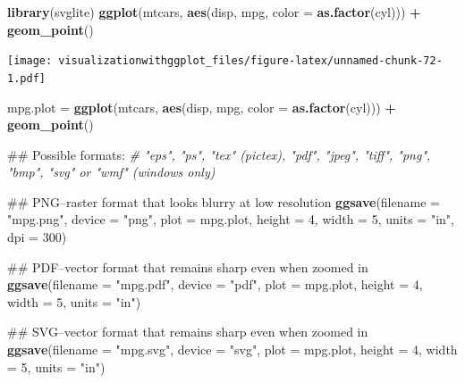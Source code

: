\documentclass[]{krantz}
\makeatletter
\newenvironment{Shaded}{\begin{snugshade}}{\end{snugshade}}
\newcommand{\KeywordTok}[1]{\textcolor[rgb]{0.13,0.29,0.53}{\textbf{#1}}}
\newcommand{\DataTypeTok}[1]{\textcolor[rgb]{0.13,0.29,0.53}{#1}}
\newcommand{\DecValTok}[1]{\textcolor[rgb]{0.00,0.00,0.81}{#1}}
\newcommand{\StringTok}[1]{\textcolor[rgb]{0.31,0.60,0.02}{#1}}
\newcommand{\CommentTok}[1]{\textcolor[rgb]{0.56,0.35,0.01}{\textit{#1}}}
\newcommand{\OperatorTok}[1]{\textcolor[rgb]{0.81,0.36,0.00}{\textbf{#1}}}
\newcommand{\NormalTok}[1]{#1}
\newenvironment{kframe}{%
\medskip{}
\setlength{\fboxsep}{.8em}
 \def\at@end@of@kframe{}%
 \ifinner\ifhmode%
  \def\at@end@of@kframe{\end{minipage}}%
  \begin{minipage}{\columnwidth}%
 \fi\fi%
 \def\FrameCommand##1{\hskip\@totalleftmargin \hskip-\fboxsep
 \colorbox{shadecolor}{##1}\hskip-\fboxsep
     \hskip-\linewidth \hskip-\@totalleftmargin \hskip\columnwidth}%
 \MakeFramed {\advance\hsize-\width
   \@totalleftmargin\z@ \linewidth\hsize
   \@setminipage}}%
 {\par\unskip\endMakeFramed%
 \at@end@of@kframe}
\renewenvironment{Shaded}{\begin{kframe}}{\end{kframe}}
\theoremstyle{definition}
\theoremstyle{definition}
\theoremstyle{definition}
\theoremstyle{remark}
\makeatother
\begin{document}
\begin{Shaded}
\begin{Highlighting}[]
\KeywordTok{library}\NormalTok{(svglite)}
\KeywordTok{ggplot}\NormalTok{(mtcars, }\KeywordTok{aes}\NormalTok{(disp,  mpg, }\DataTypeTok{color =} \KeywordTok{as.factor}\NormalTok{(cyl))) }\OperatorTok{+}\StringTok{ }\KeywordTok{geom_point}\NormalTok{()}
\end{Highlighting}
\end{Shaded}

\texttt{[image: visualizationwithggplot\_files/figure-latex/unnamed-chunk-72-1.pdf]}

\begin{Shaded}
\begin{Highlighting}[]
\NormalTok{mpg.plot =}\StringTok{ }\KeywordTok{ggplot}\NormalTok{(mtcars, }\KeywordTok{aes}\NormalTok{(disp,  mpg, }\DataTypeTok{color =} \KeywordTok{as.factor}\NormalTok{(cyl))) }\OperatorTok{+}\StringTok{ }\KeywordTok{geom_point}\NormalTok{()}

\NormalTok{## Possible formats:}
\CommentTok{#  "eps", "ps", "tex" (pictex), "pdf", "jpeg", "tiff", "png", "bmp", "svg" or "wmf" (windows only)}

\NormalTok{## PNG--raster format that looks blurry at low resolution  }
\KeywordTok{ggsave}\NormalTok{(}\DataTypeTok{filename =} \StringTok{"mpg.png"}\NormalTok{, }\DataTypeTok{device =} \StringTok{"png"}\NormalTok{,}
       \DataTypeTok{plot =}\NormalTok{ mpg.plot, }\DataTypeTok{height =} \DecValTok{4}\NormalTok{, }\DataTypeTok{width =} \DecValTok{5}\NormalTok{, }\DataTypeTok{units =} \StringTok{"in"}\NormalTok{, }\DataTypeTok{dpi =} \DecValTok{300}\NormalTok{)}

\NormalTok{## PDF--vector format that remains sharp even when zoomed in}
\KeywordTok{ggsave}\NormalTok{(}\DataTypeTok{filename =} \StringTok{"mpg.pdf"}\NormalTok{, }\DataTypeTok{device =} \StringTok{"pdf"}\NormalTok{,}
       \DataTypeTok{plot =}\NormalTok{ mpg.plot, }\DataTypeTok{height =} \DecValTok{4}\NormalTok{, }\DataTypeTok{width =} \DecValTok{5}\NormalTok{, }\DataTypeTok{units =} \StringTok{"in"}\NormalTok{)}

\NormalTok{## SVG--vector format that remains sharp even when zoomed in}
\KeywordTok{ggsave}\NormalTok{(}\DataTypeTok{filename =} \StringTok{"mpg.svg"}\NormalTok{, }\DataTypeTok{device =} \StringTok{"svg"}\NormalTok{,}
       \DataTypeTok{plot =}\NormalTok{ mpg.plot, }\DataTypeTok{height =} \DecValTok{4}\NormalTok{, }\DataTypeTok{width =} \DecValTok{5}\NormalTok{, }\DataTypeTok{units =} \StringTok{"in"}\NormalTok{)}



\end{Highlighting}
\end{Shaded}
\end{document}
